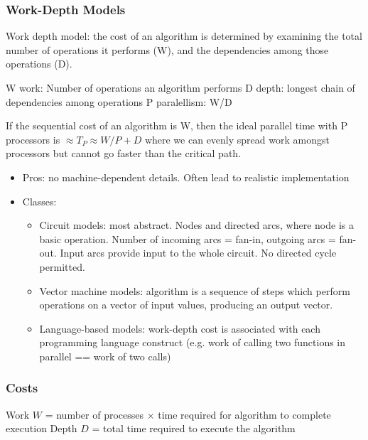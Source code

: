 \subsubsection{Work-Depth Models}

\begin{definition}
Work depth model: the cost of an algorithm is determined by examining the total number of operations it performs (W), and the dependencies among those operations (D).
\end{definition}
\begin{definition}
W work: Number of operations an algorithm performs
D depth: longest chain of dependencies among operations
P paralellism: W/D
\end{definition}

If the sequential cost of an algorithm is W, then the ideal parallel time with P processors is $\approx T_P \approx W/P + D$ where we can evenly spread work amongst processors but cannot go faster than the critical path. 

\begin{itemize}
    \item Pros: no machine-dependent details. Often lead to realistic implementation
    \item Classes:
    \begin{itemize}
        \item Circuit models: most abstract. Nodes and directed arcs, where node is a basic operation. Number of incoming arcs = fan-in, outgoing arcs = fan-out. Input arcs provide input to the whole circuit. No directed cycle permitted. 
        \item Vector machine models: algorithm is a sequence of steps which perform operations on a vector of input values, producing an output vector. 
        \item Language-based models: work-depth cost is associated with each programming language construct (e.g. work of calling two functions in parallel == work of two calls)
    \end{itemize}
\end{itemize}

\subsubsection{Costs}

Work $W$ = number of processes $\times$ time required for algorithm to complete execution
Depth $D$ = total time required to execute the algorithm

